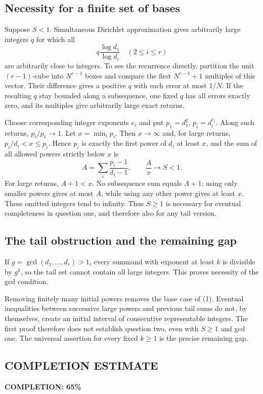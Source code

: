 \subsection*{Necessity for a finite set of bases}
Suppose $S<1$. Simultaneous Dirichlet approximation gives arbitrarily large integers $q$ for which all
\[
 q\frac{\log d_1}{\log d_i}\quad(2\le i\le r)
\]
are arbitrarily close to integers. To see the recurrence directly, partition the unit $(r-1)$-cube into $N^{r-1}$ boxes and compare the first $N^{r-1}+1$ multiples of this vector. Their difference gives a positive $q$ with each error at most $1/N$. If the resulting $q$ stay bounded along a subsequence, one fixed $q$ has all errors exactly zero, and its multiples give arbitrarily large exact returns.

Choose corresponding integer exponents $e_i$ and put $p_1=d_1^q$, $p_i=d_i^{e_i}$. Along such returns, $p_i/p_1\to1$. Let $x=\min_i p_i$. Then $x\to\infty$ and, for large returns, $p_i/d_i<x\le p_i$. Hence $p_i$ is exactly the first power of $d_i$ at least $x$, and the sum of all allowed powers strictly below $x$ is
\[
 A=\sum_i\frac{p_i-1}{d_i-1},\qquad \frac Ax\longrightarrow S<1.
\]
For large returns, $A+1<x$. No subsequence sum equals $A+1$: using only smaller powers gives at most $A$, while using any other power gives at least $x$. These omitted integers tend to infinity. Thus $S\ge1$ is necessary for eventual completeness in question one, and therefore also for any tail version.

\subsection*{The tail obstruction and the remaining gap}
If $g=\gcd(d_1,\ldots,d_r)>1$, every summand with exponent at least $k$ is divisible by $g^k$, so the tail set cannot contain all large integers. This proves necessity of the gcd condition.

Removing finitely many initial powers removes the base case of (1). Eventual inequalities between successive large powers and previous tail sums do not, by themselves, create an initial interval of consecutive representable integers. The first proof therefore does not establish question two, even with $S\ge1$ and gcd one. The universal assertion for every fixed $k\ge1$ is the precise remaining gap.
\subsection*{COMPLETION ESTIMATE}
\textbf{COMPLETION: 65\%}
